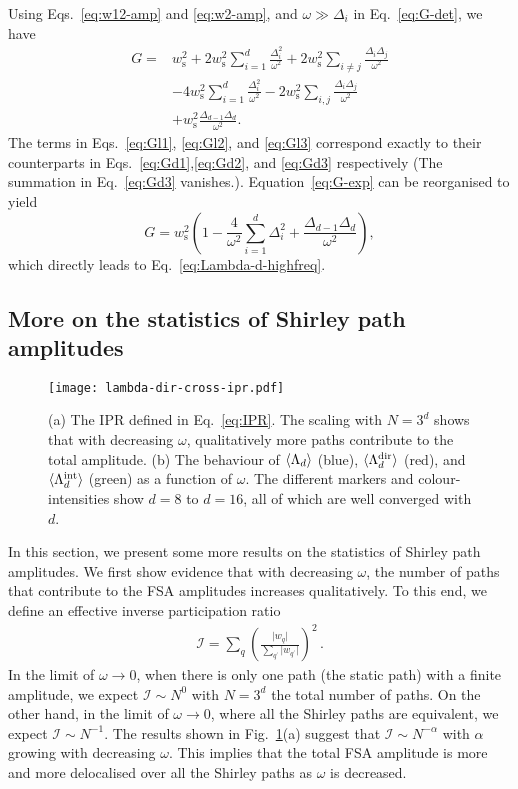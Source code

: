 \documentclass[aps,prl,twocolumn,superscriptaddress,nobalancelastpage,longbibliography]{revtex4-2}
\newcommand\eq[1]{\begin{align}#1\end{align}}
\begin{document}
Using Eqs.~\ref{eq:w12-amp} and \ref{eq:w2-amp}, and $\omega\gg\Delta_i$ in Eq.~\ref{eq:G-det}, we have
\begin{subequations}
\begin{align}
G =& w_\mathrm{s}^2 +  2w_\mathrm{s}^2\sum_{i=1}^d \frac{\Delta_i^2}{\omega^2} + 2w_\mathrm{s}^2\sum_{i\neq j}\frac{\Delta_i\Delta_j}{\omega^2} \label{eq:Gl1} \\
&-4w_\mathrm{s}^2\sum_{i=1}^d\frac{\Delta_i^2}{\omega^2} -2w_\mathrm{s}^2\sum_{i,j}\frac{\Delta_i\Delta_j}{\omega^2}\label{eq:Gl2}\\
&+w_\mathrm{s}^2\frac{\Delta_{d-1}\Delta_{d}}{\omega^2}\label{eq:Gl3}.
\end{align}
\label{eq:G-exp}
\end{subequations}
The terms in Eqs.~\ref{eq:Gl1}, \ref{eq:Gl2}, and \ref{eq:Gl3} correspond exactly to their counterparts in Eqs.~\ref{eq:Gd1},\ref{eq:Gd2}, and \ref{eq:Gd3} respectively (The summation in Eq.~\ref{eq:Gd3} vanishes.). Equation~\ref{eq:G-exp} can be reorganised to yield
\begin{equation}
G = w_\mathrm{s}^2\left(1-\frac{4}{\omega^2}\sum_{i=1}^d\Delta_i^2+\frac{\Delta_{d-1}\Delta_{d}}{\omega^2}\right),
\end{equation}
which directly leads to Eq.~\ref{eq:Lambda-d-highfreq}.

\subsection{More on the statistics of Shirley path amplitudes}
\begin{figure}
    \texttt{[image: lambda-dir-cross-ipr.pdf]}
    \caption{(a) The IPR defined in Eq.~\ref{eq:IPR}. The scaling with $N=3^d$ shows that with decreasing $\omega$, qualitatively more paths contribute to the total amplitude. (b) The behaviour of $\braket{\Lambda_d}$ (blue), $\braket{\Lambda_d^\mathrm{dir}}$ (red), and $\braket{\Lambda_d^\mathrm{int}}$ (green) as a function of $\omega$. The different markers and colour-intensities show $d=8$ to $d=16$, all of which are well converged with $d$.}
    \label{fig:lambda-dir-cross-ipr}
\end{figure}
In this section, we present some more results on the statistics of Shirley path amplitudes. 
We first show evidence that with decreasing $\omega$, the number of paths that contribute to the FSA amplitudes increases qualitatively.
To this end, we define an effective inverse participation ratio
\eq{
\mathcal{I} = \sum_{q}\left(\frac{\vert w_q\vert}{\sum_{q^\prime} \vert w_{q^\prime}\vert}\right)^2\,.
\label{eq:IPR}
}
In the limit of $\omega\to 0$, when there is only one path (the static path) with a finite amplitude, we expect $\mathcal{I}\sim N^0$ with $N=3^d$ the total number of paths.
On the other hand, in the limit of $\omega\to 0$, where all the Shirley paths are equivalent, we expect $\mathcal{I}\sim N^{-1}$.
The results shown in Fig.~\ref{fig:lambda-dir-cross-ipr}(a) suggest that $\mathcal{I}\sim N^{-\alpha} $ with $\alpha$ growing with decreasing $\omega$. 
This implies that the total FSA amplitude is more and more delocalised over all the Shirley paths as $\omega$ is decreased.
\end{document}
